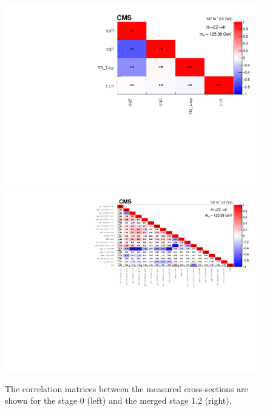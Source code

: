 \begin{figure}[!htb]
	\begin{center}
		\includegraphics[height=0.6\linewidth]{Figures/results/stxs/scov_stxs0_125_38.pdf}
		\includegraphics[height=0.6\linewidth]{Figures/results/stxs/scov_stxs1p2_125_38.pdf}
		\caption{The correlation matrices between the measured cross-sections are shown for the stage 0 (left) and the merged stage 1.2 (right).
			\label{fig:corrmatrix}}
	\end{center}
\end{figure}





